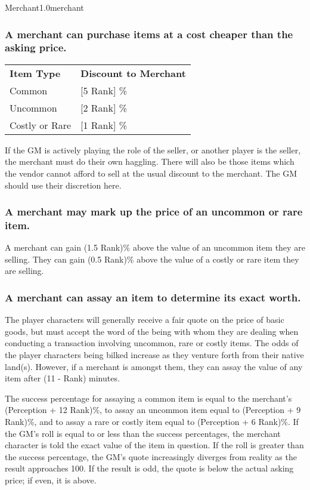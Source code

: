 \begin{skill}{Merchant}{1.0}{merchant}
\subsubsection{A merchant can purchase items at a cost cheaper than the
asking price.}

\smallskip
\begin{tabular}{ll}
\textbf{Item Type}	& \textbf{Discount to Merchant} \\
Common			& [5 \x Rank] \% \\
Uncommon		& [2 \x Rank] \% \\
Costly or Rare		& [1 \x Rank] \% \\
\end{tabular}
\smallskip

If the GM is actively playing the role of the seller, or another
player is the seller, the merchant must do their own haggling.  There
will also be those items which the vendor cannot afford to sell at the
usual discount to the merchant.  The GM should use their discretion
here.

\subsubsection{A merchant may mark up the price of an uncommon or rare
item.}
  
A merchant can gain (1.5 \x Rank)\% above the value of an uncommon
item they are selling.  They can gain (0.5 \x Rank)\% above the value
of a costly or rare item they are selling.

\subsubsection{A merchant can assay an item to determine its exact worth.}

The player characters will generally receive a fair quote on the price
of basic goods, but must accept the word of the being with whom they
are dealing when conducting a transaction involving uncommon, rare or
costly items.  The odds of the player characters being bilked increase
as they venture forth from their native land(s).  However, if a
merchant is amongst them, they can assay the value of any item after
(11 - Rank) minutes.

The success percentage for assaying a common item is equal to the
merchant's (Perception + 12 \x Rank)\%, to assay an uncommon item
equal to (Perception + 9 \x Rank)\%, and to assay a rare or costly
item equal to (Perception + 6 \x Rank)\%.  If the GM's roll is equal
to or less than the success percentages, the merchant character is
told the exact value of the item in question.  If the roll is greater
than the success percentage, the GM's quote increasingly diverges from
reality as the result approaches 100.  If the result is odd, the quote
is below the actual asking price; if even, it is above.


\end{skill}
